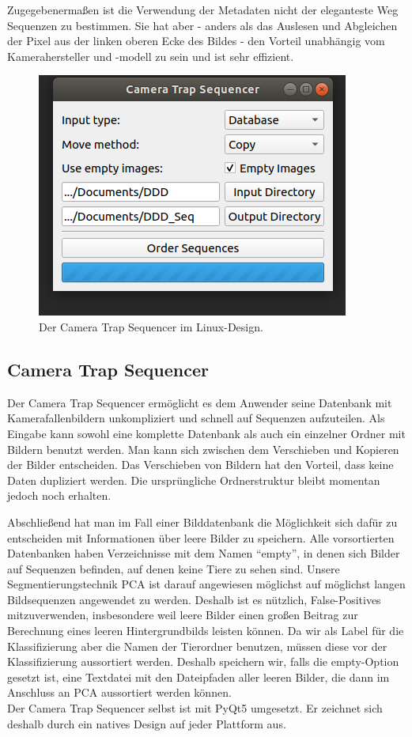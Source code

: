 Zugegebenermaßen ist die Verwendung der Metadaten nicht der eleganteste Weg Sequenzen zu bestimmen. Sie hat aber - anders als das Auslesen und Abgleichen der Pixel aus der linken oberen Ecke des Bildes - den Vorteil unabhängig vom Kamerahersteller und -modell zu sein und ist sehr effizient.

\begin{figure}
	\centering
	\includegraphics[scale=0.5]{img/CameraTrapSequencer.png}
	\caption{Der Camera Trap Sequencer im Linux-Design.}
	\label{fig:SequencerGUI}
\end{figure}

\subsection{Camera Trap Sequencer}

Der Camera Trap Sequencer ermöglicht es dem Anwender seine Datenbank mit Kamerafallenbildern unkompliziert und schnell auf Sequenzen aufzuteilen. Als Eingabe kann sowohl eine komplette Datenbank als auch ein einzelner Ordner mit Bildern benutzt werden. Man kann sich zwischen dem Verschieben und Kopieren der Bilder entscheiden. Das Verschieben von Bildern hat den Vorteil, dass keine Daten dupliziert werden. Die ursprüngliche Ordnerstruktur bleibt momentan jedoch noch erhalten. 

Abschließend hat man im Fall einer Bilddatenbank die Möglichkeit sich dafür zu entscheiden mit Informationen über leere Bilder zu speichern. Alle vorsortierten Datenbanken haben Verzeichnisse mit dem Namen \enquote{empty}, in denen sich Bilder auf Sequenzen befinden, auf denen keine Tiere zu sehen sind. Unsere Segmentierungstechnik PCA ist darauf angewiesen möglichst auf möglichst langen Bildsequenzen angewendet zu werden. Deshalb ist es nützlich, False-Positives mitzuverwenden, insbesondere weil leere Bilder einen großen Beitrag zur Berechnung eines leeren Hintergrundbilds leisten können. Da wir als Label für die Klassifizierung aber die Namen der Tierordner benutzen, müssen diese vor der Klassifizierung aussortiert werden. Deshalb speichern wir, falls die empty-Option gesetzt ist, eine Textdatei mit den Dateipfaden aller leeren Bilder, die dann im Anschluss an PCA aussortiert werden können. \\
Der Camera Trap Sequencer selbst ist mit PyQt5 umgesetzt. Er zeichnet sich deshalb durch ein natives Design auf jeder Plattform aus.
